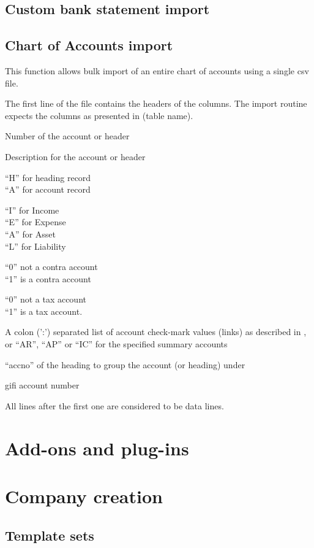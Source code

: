 \section{Custom bank statement import}
\label{sec-customization-batch-import-bank-statement}

\section{Chart of Accounts import}
\label{subsec-customization-import-coa}

This function allows bulk import of an entire chart of accounts using a
single \gls{csv} file.

The first line of the file contains the headers of the columns. The
import routine expects the columns as presented in (table name).

\begin{description}[style=nextline]
\item [accno] Number of the account or header
\item [desc] Description for the account or header
\item [charttype] ``H'' for heading record \\
``A'' for account record
\item [category] ``I'' for Income \\
``E'' for Expense \\
``A'' for Asset \\
``L'' for Liability
\item [contra] ``0'' not a \gls{contra} account \\
``1'' is a \gls{contra} account
\item [tax] ``0'' not a tax account \\
``1'' is a tax account.
\item [link] A colon (':') separated list of account check-mark values (links) as described
    in , or ``AR'', ``AP'' or ``IC'' for the specified summary accounts
\item [heading] ``accno'' of the heading to group the account (or heading) under
\item [gifi] \gls{gifi} account number
\end{description}

All lines after the first one are considered to be data lines.

\chapter{Add-ons and plug-ins}
\label{cha-customization-add-ons}

\chapter{Company creation}
\label{cha-customization-company-creation}

\section{Template sets}
\label{sec-customization-company-creation-templates}

